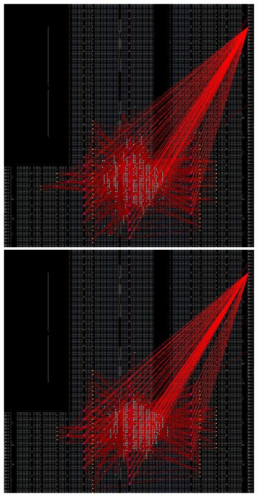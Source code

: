 {    \includegraphics[valign=t, scale=0.13]{figures/results/PlacerGreedyRandom/00000100.png}
    \includegraphics[valign=t, scale=0.13]{figures/results/PlacerGreedyRandom/00000299.png}
    \label{fig:PGRSnapshots}
}

